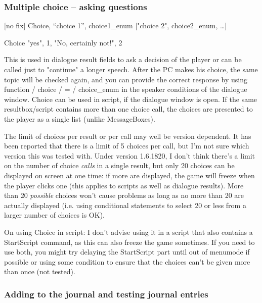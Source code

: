 \hypertarget{multiple-choice-asking-questions}{%
\subsubsection{Multiple choice -- asking
questions}\label{multiple-choice-asking-questions}}

{[}no fix{]} Choice, ``choice 1'', choice1\_enum {[}"choice 2",
choice2\_enum, \ldots{]}

Choice "yes", 1, "No, certainly not!", 2

This is used in dialogue result fields to ask a decision of the player
or can be called just to "continue" a longer speech. After the PC makes
his choice, the same topic will be checked again, and you can provide
the correct response by using function / choice / = / choice\_enum in
the speaker conditions of the dialogue window. Choice can be used in
script, if the dialogue window is open. If the same resultbox/script
contains more than one choice call, the choices are presented to the
player as a single list (unlike MessageBoxes).


The limit of choices per result or per call may well be version
dependent. It has been reported that there is a limit of 5 choices per
call, but I'm not sure which version this was tested with. Under version
1.6.1820, I don't think there's a limit on the number of choice
\emph{calls} in a single result, but only 20 choices can be displayed on
screen at one time: if more are displayed, the game will freeze when the
player clicks one (this applies to scripts as well as dialogue results).
More than 20 \emph{possible} choices won't cause problems as long as no
more than 20 are actually displayed (i.e. using conditional statements
to select 20 or less from a larger number of choices is OK).

On using Choice in script: I don't advise using it in a script that also
contains a StartScript command, as this can also freeze the game
sometimes. If you need to use both, you might try delaying the
StartScript part until out of menumode if possible or using some
condition to ensure that the choices can't be given more than once (not
tested).

\hypertarget{adding-to-the-journal-and-testing-journal-entries}{%
\subsubsection{Adding to the journal and testing journal
entries}\label{adding-to-the-journal-and-testing-journal-entries}}

